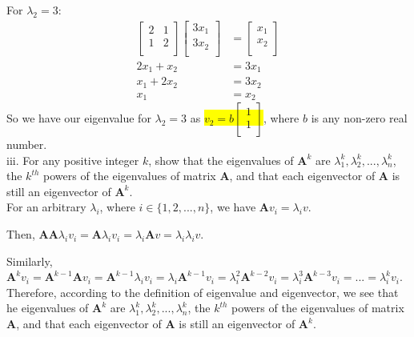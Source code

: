 \documentclass[12pt]{article}
\begin{document}
For $\lambda_2 = 3$:
\begin{align*}
\begin{bmatrix}  2  & 1 \\ 1 & 2  \\ \end{bmatrix} \begin{bmatrix}  3x_1 \\ 3x_2 \\ \end{bmatrix} &= \begin{bmatrix}  x_1 \\ x_2 \\ \end{bmatrix}\\
2x_1 + x_2 &= 3x_1\\
x_1 + 2x_2 &= 3x_2\\
x_1 &= x_2
\end{align*}
So we have our eigenvalue for $\lambda_2 = 3$ as \colorbox{yellow}{$v_2 = b\begin{bmatrix}  1 \\ 1 \\ \end{bmatrix}$}, where $b$ is any non-zero real number.\\

iii. For any positive integer $k$, show that the eigenvalues of $\mathbf{A}^k$ are $\lambda_1^k, \lambda_2^k,...,\lambda_n^k$, the $k^{th}$ powers of the eigenvalues of matrix $\mathbf{A}$, and that each eigenvector of $\mathbf{A}$ is still an eigenvector of $\mathbf{A}^k$.\\

For an arbitrary $\lambda_i$, where $i \in \{1,2, ... , n\}$, we have $\mathbf{A}v_i = \lambda_i v$.

Then, $\mathbf{A}\mathbf{A}\lambda_i v_i = \mathbf{A}\lambda_i v_i = \lambda_i \mathbf{A} v = \lambda_i \lambda_i v$.

Similarly, $\mathbf{A}^k v_i = \mathbf{A}^{k-1}\mathbf{A} v_i =  \mathbf{A}^{k-1} \lambda_i v_i = \lambda_i \mathbf{A}^{k-1} v_i = \lambda_i^2 \mathbf{A}^{k-2} v_i = \lambda_i^3 \mathbf{A}^{k-3} v_i = ... = \lambda_i^k v_i$.\\

Therefore, according to the definition of eigenvalue and eigenvector, we see that he eigenvalues of $\mathbf{A}^k$ are $\lambda_1^k, \lambda_2^k,...,\lambda_n^k$, the $k^{th}$ powers of the eigenvalues of matrix $\mathbf{A}$, and that each eigenvector of $\mathbf{A}$ is still an eigenvector of $\mathbf{A}^k$.\\
\end{document}
